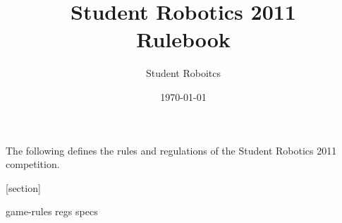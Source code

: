 \documentclass[a4paper, 12pt]{scrartcl}
\author{Student Roboitcs}
\title {Student Robotics 2011\\ Rulebook}
\date{\today}
\begin{document}
\maketitle

\noindent The following defines the rules and regulations of the Student Robotics 2011 competition.

[section]
\newcommand{\rcn}{\stepcounter{rule}\arabic{section}.\arabic{rule}}
\renewcommand{\labelenumi}{\rcn}

 {game-rules}
\newpage
 {regs}
\newpage
 {specs}

\end{document}
